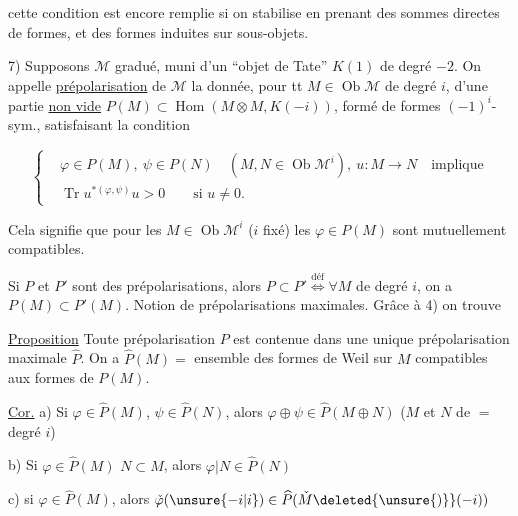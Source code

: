 
cette condition est encore remplie si on stabilise en prenant des sommes directes de formes, et des formes induites sur sous-objets.


7)  Supposons $\mathcal M$ gradué, muni d'un ``objet de Tate'' $K(1)$ de degré $-2$. On appelle \uline{prépolarisation}  de $\mathcal M$ la donnée,  pour tt $M\in\operatorname{Ob}\mathcal M$ de degré $i$, d'une partie \uline{non vide}  $P(M)\subset\operatorname{Hom}(M\otimes M,K(-i))$, formé de formes $(-1)^i$-sym.,  satisfaisant la condition

\[
\left\{\begin{aligned}
&\varphi\in P(M),\ \psi\in P(N)\quad(M,N\in\operatorname{Ob}\mathcal M^i),\ u:M\to N\quad\text{implique}\\
&\operatorname{Tr}u^{*(\varphi,\psi)}u>0\qquad\text{si }u\ne0.
\end{aligned}\right. \tag*{(P1)}
\]

Cela signifie que pour les $M\in\operatorname{Ob}\mathcal M^i$ ($i$ fixé) les $\varphi\in P(M)$ sont mutuellement compatibles.


Si $P$ et $P'$ sont des prépolarisations, alors $P\subset P'\overset{\text{déf}}{\Longleftrightarrow}\forall M$ de degré $i$, on a $P(M)\subset P'(M)$. Notion de prépolarisations maximales. Grâce à 4) on trouve

\uline{Proposition} Toute prépolarisation $P$ est contenue dans une unique prépolarisation maximale $\widehat P$. On a $\widehat P(M)=$ ensemble des formes de Weil sur $M$ compatibles aux formes de $P(M)$.

\uline{Cor.} a) Si $\varphi\in\widehat P(M)$, $\psi\in\widehat P(N)$, alors $\varphi\oplus\psi\in\widehat P(M\oplus N)$ ($M$ et $N$ de $=$ degré $i$)

b) Si $\varphi\in\widehat P(M)$  $N\subset M$, alors $\varphi|N\in\widehat P(N)$

c) si $\varphi\in\widehat P(M)$, alors $\check\varphi(\unsure{-i|i})\in\widehat P(\check M\deleted{\unsure{)}}(-i))$


